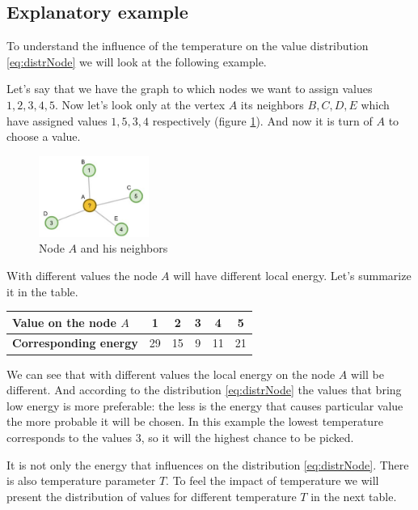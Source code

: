 \documentclass[12pt]{report}
\begin{document}
\subsection{Explanatory example} 

To understand the influence of the temperature on the value distribution \ref{eq:distrNode} we will look at the following example.

Let's say that we have the graph to which nodes we want to assign values $1, 2, 3, 4, 5$. Now let's look only at the vertex $A$ its neighbors $B, C, D, E$ which have assigned values $1, 5, 3, 4$ respectively (figure \ref{fig:nodeA}). And now it is turn of $A$ to choose a value.

\begin{figure}[ht]
    \centering
    \includegraphics[height=100px]{GibbsVertexExample}
    \caption{ Node $A$ and his neighbors }
    \label{fig:nodeA}
\end{figure}

With different values the node $A$ will have different local energy. Let's summarize it in the table.
  
\begin{center} \begin{tabular}{ | l || c | c | c | c | c | } 
    \hline 
	       \textbf{Value on the node $A$} &  1 & 2  & 3 & 4  & 5\\ 
	\hline \textbf{Corresponding energy}  & 29 & 15 & 9 & 11 & 21\\  
	\hline 
\end{tabular} \end{center}

We can see that with different values the local energy on the node $A$ will be different. And according to the distribution \ref{eq:distrNode} the values that bring low energy is more preferable: the less is the energy that causes particular value the more probable it will be chosen. In this example the lowest temperature corresponds to the values $3$, so it will the highest chance to be picked.


It is not only the energy that influences on the distribution \ref{eq:distrNode}. There is also temperature parameter $T$. To feel the impact of temperature we will present the distribution of values for different temperature $T$ in the next table.
\end{document}
